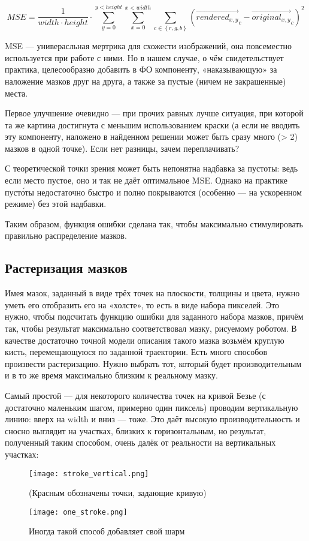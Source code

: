 \begin{equation}\label{eq:equation}
    MSE = \frac{1}{width \cdot height} \cdot \sum_{y = 0}^{y < height} { \sum_{x = 0}^{x < width} { \sum_{c \in  \left\{ r, g, b \right\} } { \left( {\overrightarrow {rendered_{x, y}}}_c - {\overrightarrow{original_{x, y}}}_c\right)^2 }}}
\end{equation}

MSE — универасльная мертрика для схожести изображений, она повсеместно используется при работе с ними.
Но в нашем случае, о чём свидетельствует практика, целесообразно добавить в ФО компоненту, «наказывающую» за наложение мазков друг на друга, а также за пустые (ничем не закрашенные) места.

Первое улучшение очевидно — при прочих равных лучше ситуация, при которой та же картина достигнута с меньшим использованием краски
(а если не вводить эту компоненту, наложено в найденном решении может быть сразу много (> 2) мазков в одной точке).
Если нет разницы, зачем переплачивать?

С теоретической точки зрения может быть непонятна надбавка за пустоты: ведь если место пустое, оно и так не даёт оптимальное MSE.
Однако на практике пусто́ты недостаточно быстро и полно покрываются (особенно — на ускоренном режиме) без этой надбавки.

Таким образом, функция ошибки сделана так, чтобы максимально стимулировать правильно распределение мазков.

\subsection{Растеризация мазков}\label{subsec:rasterization}
Имея мазок, заданный в виде трёх точек на плоскости, толщины и цвета, нужно уметь его отобразить его на «холсте», то есть в виде набора пикселей.
Это нужно, чтобы подсчитать функцию ошибки для заданного набора мазков,
причём так, чтобы результат максимально соответствовал мазку, рисуемому роботом.
В качестве достаточно точной модели описания такого мазка возьмём круглую кисть, перемещающуюся по заданной траектории.
Есть много способов произвести растеризацию.
Нужно выбрать тот, который будет производительным и в то же время максимально близким к реальному мазку.

Самый простой — для некоторого количества точек на кривой Безье (с достаточно маленьким шагом, примерно один пиксель) проводим вертикальную линию: вверх на width и  вниз — тоже.
Это даёт высокую производительность и сносно выглядит на участках, близких к горизонтальным, но результат, полученный таким способом, очень далёк от реальности на вертикальных участках:
\begin{figure}[h!]
    \centering
    \texttt{[image: stroke\_vertical.png]}
    \caption{(Красным обозначены точки, задающие кривую)}
    \label{fig:vertical_stroke}
\end{figure}
\begin{figure}
    \centering
    \texttt{[image: one\_stroke.png]}
    \caption{Иногда такой способ добавляет свой шарм}
    \label{fig:pretty_vert_stroke}
\end{figure}

